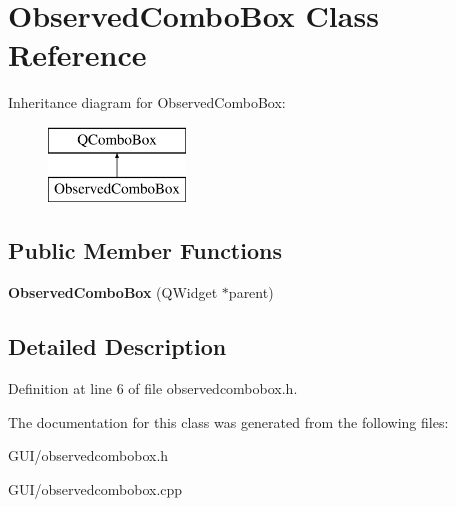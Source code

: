 \hypertarget{class_observed_combo_box}{}\section{Observed\+Combo\+Box Class Reference}
\label{class_observed_combo_box}
Inheritance diagram for Observed\+Combo\+Box\+:\begin{figure}[H]
\begin{center}
\leavevmode
\includegraphics[height=2.000000cm]{class_observed_combo_box}
\end{center}
\end{figure}
\subsection*{Public Member Functions}
\begin{DoxyCompactItemize}
\item 
\mbox{\label{class_observed_combo_box_a1017be1f4470200b6579ed91f709bad5}} 
{\bfseries Observed\+Combo\+Box} (Q\+Widget $\ast$parent)
\end{DoxyCompactItemize}


\subsection{Detailed Description}


Definition at line 6 of file observedcombobox.\+h.



The documentation for this class was generated from the following files\+:\begin{DoxyCompactItemize}
\item 
G\+U\+I/observedcombobox.\+h\item 
G\+U\+I/observedcombobox.\+cpp\end{DoxyCompactItemize}
